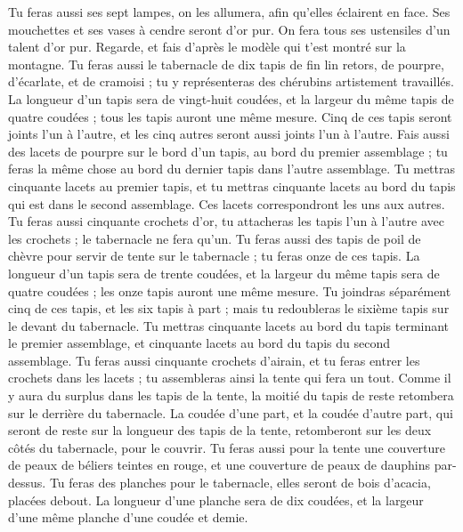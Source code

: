 \begin{multicols}{2}
Tu feras aussi ses sept lampes, on les allumera, afin qu'elles éclairent en face.
Ses mouchettes et ses vases à cendre seront d’or pur.
On fera tous ses ustensiles d'un talent d’or pur.
Regarde, et fais d’après le modèle qui t'est montré sur la montagne.
\VerseOne{}Tu feras aussi le tabernacle de dix tapis de fin lin retors, de pourpre, d'écarlate, et de cramoisi ; tu y représenteras des chérubins artistement travaillés.
La longueur d'un tapis sera de vingt-huit coudées, et la largeur du même tapis de quatre coudées ; tous les tapis auront une même mesure.
Cinq de ces tapis seront joints l'un à l'autre, et les cinq autres seront aussi joints l'un à l'autre.
Fais aussi des lacets de pourpre sur le bord d'un tapis, au bord du premier assemblage ; tu feras la même chose au bord du dernier tapis dans l'autre assemblage.
Tu mettras cinquante lacets au premier tapis, et tu mettras cinquante lacets au bord du tapis qui est dans le second assemblage. Ces lacets correspondront les uns aux autres.
Tu feras aussi cinquante crochets d'or, tu attacheras les tapis l'un à l'autre avec les crochets ; le tabernacle ne fera qu’un.
Tu feras aussi des tapis de poil de chèvre pour servir de tente sur le tabernacle ; tu feras onze de ces tapis.
La longueur d'un tapis sera de trente coudées, et la largeur du même tapis sera de quatre coudées ; les onze tapis auront une même mesure.
Tu joindras séparément cinq de ces tapis, et les six tapis à part ; mais tu redoubleras le sixième tapis sur le devant du tabernacle.
Tu mettras cinquante lacets au bord du tapis terminant le premier assemblage, et cinquante lacets au bord du tapis du second assemblage.
Tu feras aussi cinquante crochets d'airain, et tu feras entrer les crochets dans les lacets ; tu assembleras ainsi la tente qui fera un tout.
Comme il y aura du surplus dans les tapis de la tente, la moitié du tapis de reste retombera sur le derrière du tabernacle.
La coudée d’une part, et la coudée d’autre part, qui seront de reste sur la longueur des tapis de la tente, retomberont sur les deux côtés du tabernacle, pour le couvrir.
Tu feras aussi pour la tente une couverture de peaux de béliers teintes en rouge, et une couverture de peaux de dauphins par-dessus.
Tu feras des planches pour le tabernacle, elles seront de bois d’acacia, placées debout.
La longueur d'une planche sera de dix coudées, et la largeur d’une même planche d'une coudée et demie.

\end{multicols}
